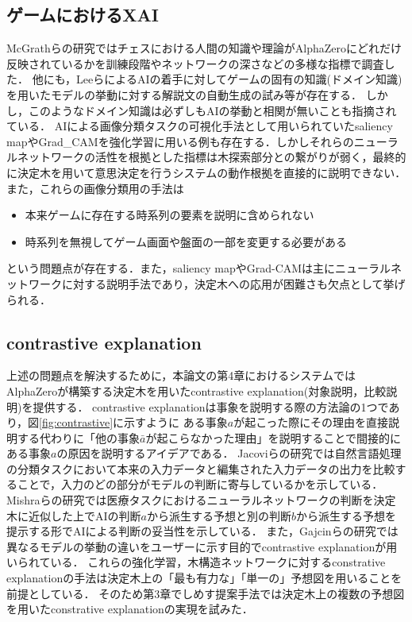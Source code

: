 \subsection{ゲームにおけるXAI}
McGrathらの研究\cite{DeepMind}ではチェスにおける人間の知識や理論がAlphaZeroにどれだけ反映されているかを訓練段階やネットワークの深さなどの多様な指標で調査した．
他にも，Leeら\cite{DecodeChess}によるAIの着手に対してゲームの固有の知識(ドメイン知識)を用いたモデルの挙動に対する解説文の自動生成の試み等が存在する．
しかし，このようなドメイン知識は必ずしもAIの挙動と相関が無いことも指摘されている\cite{DeepMind}．
AIによる画像分類タスクの可視化手法として用いられていたsaliency map\cite{saliency}やGrad\_CAM\cite{Grad-CAM}を強化学習に用いる例も存在する\cite{gl}\cite{atari-saliency}\cite{visualize}．しかしそれらのニューラルネットワークの活性を根拠とした指標は木探索部分との繋がりが弱く，最終的に決定木を用いて意思決定を行うシステムの動作根拠を直接的に説明できない．
また，これらの画像分類用の手法は
\begin{itemize}
	\item 本来ゲームに存在する時系列の要素を説明に含められない
	\item 時系列を無視してゲーム画面や盤面の一部を変更する必要がある
\end{itemize}
という問題点が存在する．また，saliency mapやGrad-CAMは主にニューラルネットワークに対する説明手法であり，決定木への応用が困難さも欠点として挙げられる．

\subsection{contrastive explanation}
上述の問題点を解決するために，本論文の第4章におけるシステムではAlphaZeroが構築する決定木を用いたcontrastive explanation(対象説明，比較説明)を提供する．
contrastive explanationは事象を説明する際の方法論の1つであり，図\ref{fig:contrastive}に示すように
ある事象$a$が起こった際にその理由を直接説明する代わりに「他の事象$\bar{a}$が起こらなかった理由」を説明することで間接的にある事象$a$の原因を説明するアイデアである\cite{contrastive}．
Jacoviらの研究\cite{contrastive}では自然言語処理の分類タスクにおいて本来の入力データと編集された入力データの出力を比較することで，入力のどの部分がモデルの判断に寄与しているかを示している．
Mishraらの研究\cite{whyNot}では医療タスクにおけるニューラルネットワークの判断を決定木に近似した上でAIの判断$a$から派生する予想と別の判断$b$から派生する予想を提示する形でAIによる判断の妥当性を示している．
また，Gajcinらの研究\cite{preference}では異なるモデルの挙動の違いをユーザーに示す目的でcontrastive explanationが用いられている．
これらの強化学習，木構造ネットワークに対するconstrative explanationの手法は決定木上の「最も有力な」「単一の」予想図を用いることを前提としている．
そのため第3章でしめす提案手法では決定木上の複数の予想図を用いたconstrative explanationの実現を試みた．

